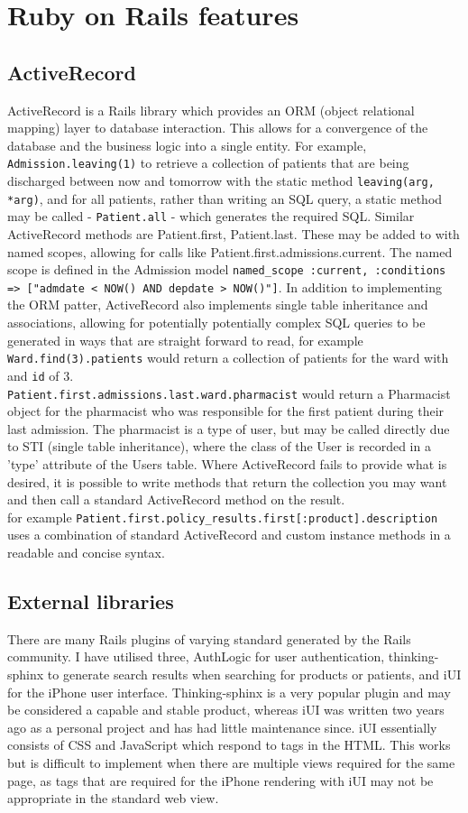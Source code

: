 \documentclass[letterpaper]{amsart}
\begin{document}
\section{Ruby on Rails features}
\subsection{ActiveRecord}
ActiveRecord is a Rails library which provides an ORM (object relational mapping) layer to database interaction.  This allows for a convergence of the database and the business logic into a single entity.  For example, \texttt{Admission.leaving(1)} to retrieve a collection of patients that are being discharged between now and tomorrow with the static method \texttt{leaving(arg, *arg)}, and for all patients, rather than writing an SQL query, a static method may be called - \texttt{Patient.all} - which generates the required SQL. Similar ActiveRecord methods are Patient.first, Patient.last.  These may be added to with named scopes, allowing for calls like Patient.first.admissions.current.  The named scope is defined in the Admission model \texttt{named\_scope :current, :conditions =>  ["admdate <  NOW() AND depdate > NOW()"]}.  In addition to implementing the ORM patter, ActiveRecord also implements single table inheritance and associations, allowing for potentially potentially complex SQL queries to be generated in ways that are straight forward to read, for example \texttt{Ward.find(3).patients} would return a collection of patients for the ward with and \texttt{id} of 3.\\ \texttt{Patient.first.admissions.last.ward.pharmacist} would return a Pharmacist object for the pharmacist who was responsible for the first patient during their last admission.  The pharmacist is a type of user, but may be called directly due to STI (single table inheritance), where the class of the User is recorded in a 'type' attribute of the Users table.  Where ActiveRecord fails to provide what is desired, it is possible to write methods that return the collection you may want and then call a standard ActiveRecord method on the result.\\ for example \texttt{Patient.first.policy\_results.first[:product].description} uses a combination of standard ActiveRecord and custom instance methods in a readable and concise syntax.
\subsection{External libraries}
There are many Rails plugins of varying standard generated by the Rails community.  I have utilised three, AuthLogic for user authentication, thinking-sphinx to generate search results when searching for products or patients, and iUI for the iPhone user interface. Thinking-sphinx is a very popular plugin and may be considered a capable and stable product, whereas iUI was written two years ago as a personal project and has had little maintenance since. iUI essentially consists of CSS and JavaScript which respond to tags in the HTML.  This works but is difficult to implement when there are multiple views required for the same page, as tags that are required for the iPhone rendering with iUI may not be appropriate in the standard web view.
\end{document}
